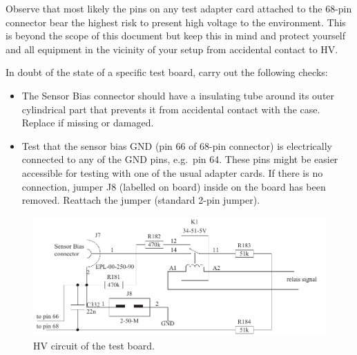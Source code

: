 Observe that most likely the pins on any test adapter card attached to the 68-pin connector bear the highest risk to present high voltage to the environment. This is beyond the scope of this document but keep this in mind and protect yourself and all equipment in the vicinity of your setup from accidental contact to HV.

In doubt of the state of a specific test board, carry out the following checks:
\begin{itemize}
    \item The Sensor Bias connector should have a insulating tube around its outer cylindrical part that prevents it from accidental contact with the case. Replace if missing or damaged.
    \item Test that the sensor bias GND (pin 66 of 68-pin connector) is electrically connected to any of the GND pins, e.g.~pin 64. These pins might be easier accessible for testing with one of the usual adapter cards. If there is no connection, jumper J8 (labelled on board) inside on the board has been removed. Reattach the jumper (standard 2-pin jumper).
\end{itemize}

\begin{figure}[hbtp]
    \begin{center}
	\includegraphics[width=.8\textwidth]{img/hvcircuit.pdf}
	\caption{HV circuit of the test board.}
	\label{fig:hvcircuit}
    \end{center}
\end{figure}

